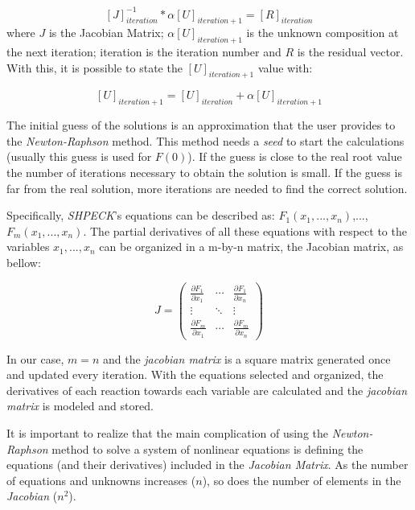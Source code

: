 \begin{equation}
\label{eq:iterativelyAlgorithm}
[J]^{-1}_{iteration}* \alpha [U]_{iteration+1} = [R]_{iteration}
\end{equation}
where $J$ is the Jacobian Matrix; $ \alpha [U]_{iteration+1} $ is the unknown composition at the next iteration; iteration is the iteration number and $R$ is the residual vector. With this, it is possible to state the $[U]_{iteration+1}$ value with:

\begin{equation}
\label{eq:CompositionCalculation}
[U]_{iteration+1} = [U]_{iteration} + \alpha [U]_{iteration+1}
\end{equation}

The initial guess of the solutions is an approximation that the user provides to the \emph{Newton-Raphson} method. This method needs a \emph{seed} to start the calculations (usually this guess is used for $F(0)$). 
If the guess is close to the real root value the number of iterations necessary to obtain the solution is small. If the guess is far from the real solution, more iterations are needed to find the correct solution.

Specifically, \emph{SHPECK}'s equations can be described as: $F_1(x_1,..., x_n)$,...,$F_m(x_1,...,x_n)$. The partial derivatives of all these equations with respect to the variables $x_1,...,x_n$ can be organized in a m-by-n matrix, the Jacobian matrix, as bellow:

\begin{equation} 
J =
 \begin{pmatrix}
  \frac{\partial F_1}{\partial x_1} & \cdots & \frac{\partial F_1}{\partial x_n} \\
  \vdots  & \ddots & \vdots  \\
  \frac{\partial F_m}{\partial x_1} & \cdots &   \frac{\partial F_m}{\partial x_n}
 \end{pmatrix}
\end{equation}

In our case, $m = n$ and the \emph{jacobian matrix} is a square matrix generated once and updated every iteration. With the equations selected and organized, the derivatives of each reaction towards each variable are calculated and the \emph{jacobian matrix} is modeled and stored. 

It is important to realize that the main complication of using the \emph{Newton-Raphson} method to solve a system of nonlinear equations is defining the equations (and their derivatives) included in the \emph{Jacobian Matrix}. 
As the number of equations and unknowns increases ($n$), so does the number of elements in the \emph{Jacobian} ($n^2$).
